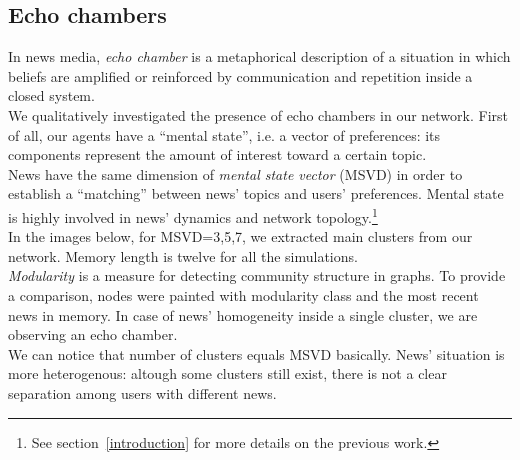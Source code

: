 \subsection{Echo chambers}
In news media, \textit{echo chamber} is a metaphorical description
of a situation in which beliefs are amplified or reinforced by
communication and repetition inside a closed system\cite{echochamwiki,echocham}.\\
We qualitatively investigated the presence of echo chambers in our network.
First of all, our agents have a ``mental  state'', i.e. a vector of preferences: its components represent the amount of interest toward a certain topic.\\
 News have the same dimension of \textit{mental state vector} (MSVD) in order to establish a ``matching'' between news' topics and users' preferences.
 Mental state is highly involved in news' dynamics and network topology.\footnote{See section~\ref{introduction} for more details on the previous work.}\\
 In the images below, for MSVD=3,5,7, we extracted main clusters from our network.
 Memory length is twelve for all the simulations.\\
 \textit{Modularity} is a measure for detecting community structure in graphs\cite{modulwiki}.
 To provide a comparison, nodes were painted with modularity class and the most recent news in memory.
 In case of news' homogeneity inside a single cluster, we are observing an echo chamber.\\
We can notice that number of clusters equals MSVD basically.
News' situation is more heterogenous: altough some clusters still exist, there is not a clear separation among users with different news.


